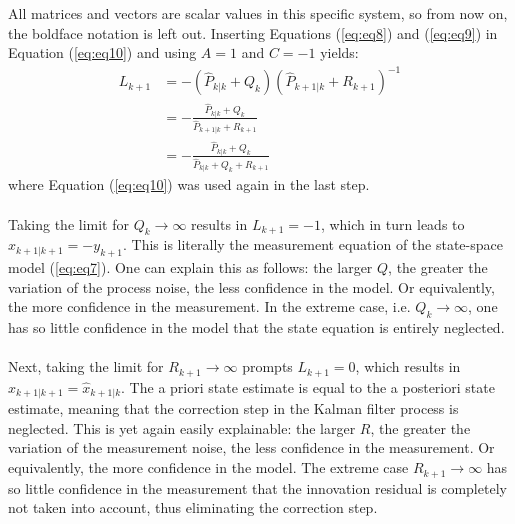 \documentclass[a4paper,kul]{kulakarticle} %
\begin{document}
\noindent All matrices and vectors are scalar values in this specific system, so from now on, the boldface notation is left out. Inserting Equations (\ref{eq:eq8}) and (\ref{eq:eq9}) in Equation (\ref{eq:eq10}) and using $A = 1$ and $C = -1$ yields:
\begin{equation}
	\begin{split}
	L_{k+1} &= -\left( \hat{P}_{k|k} + Q_k \right) \left( \hat{P}_{k+1|k} + R_{k+1} \right)^{-1} \\
	&= - \frac{\hat{P}_{k|k} + Q_k}{\hat{P}_{k+1|k} + R_{k+1}} \\
	&= - \frac{\hat{P}_{k|k} + Q_k}{\hat{P}_{k|k} + Q_k + R_{k+1}}
	\end{split}
	\label{eq:eq11}
\end{equation}
where Equation (\ref{eq:eq10}) was used again in the last step.
\\\\
Taking the limit for $Q_k \rightarrow \infty$ results in $L_{k+1} = -1$, which in turn leads to $\hat{x}_{k+1|k+1} = -y_{k+1}$. This is literally the measurement equation of the state-space model (\ref{eq:eq7}). One can explain this as follows: the larger $Q$, the greater the variation of the process noise, the less confidence in the model. Or equivalently, the more confidence in the measurement. In the extreme case, i.e. $Q_k \rightarrow \infty$, one has so little confidence in the model that the state equation is entirely neglected. 
\\\\
Next, taking the limit for $R_{k+1} \rightarrow \infty$ prompts $L_{k+1} = 0$, which results in $\hat{x}_{k+1|k+1} = \hat{x}_{k+1|k}$. The a priori state estimate is equal to the a posteriori state estimate, meaning that the correction step in the Kalman filter process is neglected. This is yet again easily explainable: the larger $R$, the greater the variation of the measurement noise, the less confidence in the measurement. Or equivalently, the more confidence in the model. The extreme case $R_{k+1} \rightarrow \infty$ has so little confidence in the measurement that the innovation residual is completely not taken into account, thus eliminating the correction step.
\end{document}
